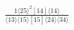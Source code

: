 \documentclass[varwidth, border=5pt]{standalone}
\begin{document}
\begin{my}
$\begin{gathered}
\scriptscriptstyle\frac{1⟨25⟩^2[14]⟨14⟩}{⟨13⟩⟨15⟩[15]⟨24⟩⟨34⟩}
\end{gathered}$
\end{my}
\end{document}
